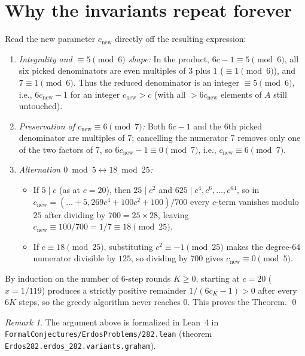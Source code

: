 \documentclass[11pt,a4paper]{amsart}
\theoremstyle{remark}
\newtheorem*{remark}{Remark}
\begin{document}
\section{Why the invariants repeat forever}

Read the new parameter $c_{\mathrm{new}}$ directly off the resulting expression:
\begin{enumerate}
\item \emph{Integrality and $\equiv 5 \pmod{6}$ shape:} In the product, $6c - 1 \equiv 5 \pmod{6}$, all six picked denominators are even multiples of $3$ plus $1$ ($\equiv 1 \pmod{6}$), and $7 \equiv 1 \pmod{6}$. Thus the reduced denominator is an integer $\equiv 5 \pmod{6}$, i.e., $6 c_{\mathrm{new}} - 1$ for an integer $c_{\mathrm{new}} > c$ (with all $> 6 c_{\mathrm{new}}$ elements of $A$ still untouched).
\item \emph{Preservation of $c_{\mathrm{new}} \equiv 6 \pmod{7}$:} Both $6c - 1$ and the $6$th picked denominator are multiples of $7$; cancelling the numerator $7$ removes only one of the two factors of $7$, so $6 c_{\mathrm{new}} - 1 \equiv 0 \pmod{7}$, i.e., $c_{\mathrm{new}} \equiv 6 \pmod{7}$.
\item \emph{Alternation $0 \bmod 5 \leftrightarrow 18 \bmod 25$:}
\begin{itemize}
\item If $5 \mid c$ (as at $c = 20$), then $25 \mid c^2$ and $625 \mid c^4, c^6, \dots, c^{64}$, so in $c_{\mathrm{new}} = (\dots + 5{,}269c^4 + 100c^2 + 100)/700$ every $c$-term vanishes modulo $25$ after dividing by $700 = 25 \times 28$, leaving $c_{\mathrm{new}} \equiv 100 / 700 = 1 / 7 \equiv 18 \pmod{25}$.
\item If $c \equiv 18 \pmod{25}$, substituting $c^2 \equiv -1 \pmod{25}$ makes the degree-$64$ numerator divisible by $125$, so dividing by $700$ gives $c_{\mathrm{new}} \equiv 0 \pmod{5}$.
\end{itemize}
\end{enumerate}

By induction on the number of $6$-step rounds $K \ge 0$, starting at $c = 20$ ($x = 1 / 119$) produces a strictly positive remainder $1 / (6 c_K - 1) > 0$ after every $6 K$ steps, so the greedy algorithm never reaches $0$. This proves the Theorem. \qed

\begin{remark}
The argument above is formalized in Lean~4 in \nolinkurl{FormalConjectures/ErdosProblems/282.lean} (theorem \texttt{Erdos282.erdos\_282.variants.graham}).
\end{remark}
\end{document}
